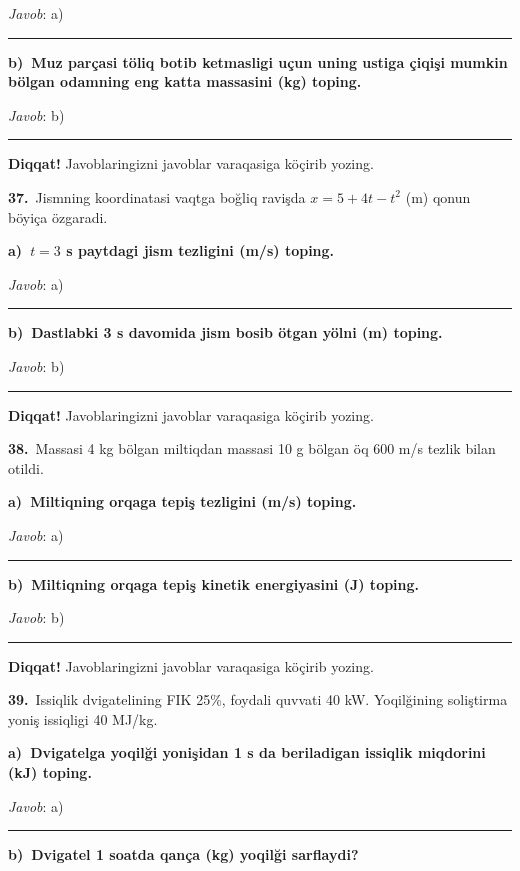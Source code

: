 \documentclass[11pt,a4paper]{article}
\newcommand{\blank}{\rule{5cm}{0.4pt}}
\begin{document}
\noindent\textit{Javob}: a)\ \blank\par
\medskip\noindent\textbf{b)\ Muz parçasi töliq botib ketmasligi uçun uning ustiga çiqişi mumkin bölgan odamning eng katta massasini (kg) toping.}\par
\noindent\textit{Javob}: b)\ \blank\par
\medskip\noindent\textbf{Diqqat!} Javoblaringizni javoblar varaqasiga köçirib yozing.\par\vspace{10pt}
\noindent\textbf{37.}\ Jismning koordinatasi vaqtga boğliq ravişda $x=5+4t-t^2$ (m) qonun böyiça özgaradi.\par\smallskip
\medskip\noindent\textbf{a)\ $t=3$ s paytdagi jism tezligini (m/s) toping.}\par
\noindent\textit{Javob}: a)\ \blank\par
\medskip\noindent\textbf{b)\ Dastlabki 3 s davomida jism bosib ötgan yölni (m) toping.}\par
\noindent\textit{Javob}: b)\ \blank\par
\medskip\noindent\textbf{Diqqat!} Javoblaringizni javoblar varaqasiga köçirib yozing.\par\vspace{10pt}
\noindent\textbf{38.}\ Massasi 4 kg bölgan miltiqdan massasi 10 g bölgan öq 600 m/s tezlik bilan otildi.\par\smallskip
\medskip\noindent\textbf{a)\ Miltiqning orqaga tepiş tezligini (m/s) toping.}\par
\noindent\textit{Javob}: a)\ \blank\par
\medskip\noindent\textbf{b)\ Miltiqning orqaga tepiş kinetik energiyasini (J) toping.}\par
\noindent\textit{Javob}: b)\ \blank\par
\medskip\noindent\textbf{Diqqat!} Javoblaringizni javoblar varaqasiga köçirib yozing.\par\vspace{10pt}
\noindent\textbf{39.}\ Issiqlik dvigatelining FIK 25\%, foydali quvvati 40 kW. Yoqilğining soliştirma yoniş issiqligi 40 MJ/kg.\par\smallskip
\medskip\noindent\textbf{a)\ Dvigatelga yoqilği yonişidan 1 s da beriladigan issiqlik miqdorini (kJ) toping.}\par
\noindent\textit{Javob}: a)\ \blank\par
\medskip\noindent\textbf{b)\ Dvigatel 1 soatda qança (kg) yoqilği sarflaydi?}\par
\end{document}
